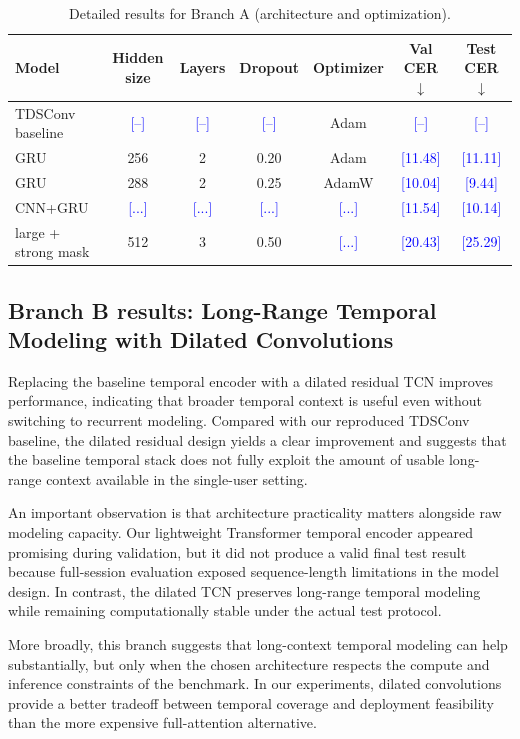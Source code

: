 \documentclass{article}
\newcommand{\todo}[1]{\textcolor{blue}{[#1]}}
\begin{document}
\begin{table}[t]
    \centering
    \caption{Detailed results for Branch A (architecture and optimization).}
    \label{tab:branchA}
    \small
    \begin{tabular}{lcccccc}
        \toprule
        Model & Hidden size & Layers & Dropout & Optimizer & Val CER $\downarrow$ & Test CER $\downarrow$ \\
        \midrule
        TDSConv baseline & \todo{--} & \todo{--} & \todo{--} & Adam & \todo{--} & \todo{--} \\
        GRU & 256 & 2 & 0.20 & Adam & \todo{11.48} & \todo{11.11} \\
        GRU & 288 & 2 & 0.25 & AdamW & \todo{10.04} & \todo{9.44} \\
        CNN+GRU & \todo{...} & \todo{...} & \todo{...} & \todo{...} & \todo{11.54} & \todo{10.14} \\
        large + strong mask & 512 & 3 & 0.50 & \todo{...} & \todo{20.43} & \todo{25.29} \\
        \bottomrule
    \end{tabular}
\end{table}

\subsection{Branch B results: Long-Range Temporal Modeling with Dilated Convolutions}
Replacing the baseline temporal encoder with a dilated residual TCN improves performance, indicating that broader temporal context is useful even without switching to recurrent modeling. Compared with our reproduced TDSConv baseline, the dilated residual design yields a clear improvement and suggests that the baseline temporal stack does not fully exploit the amount of usable long-range context available in the single-user setting.

An important observation is that architecture practicality matters alongside raw modeling capacity. Our lightweight Transformer temporal encoder appeared promising during validation, but it did not produce a valid final test result because full-session evaluation exposed sequence-length limitations in the model design. In contrast, the dilated TCN preserves long-range temporal modeling while remaining computationally stable under the actual test protocol.

More broadly, this branch suggests that long-context temporal modeling can help substantially, but only when the chosen architecture respects the compute and inference constraints of the benchmark. In our experiments, dilated convolutions provide a better tradeoff between temporal coverage and deployment feasibility than the more expensive full-attention alternative.
\end{document}
